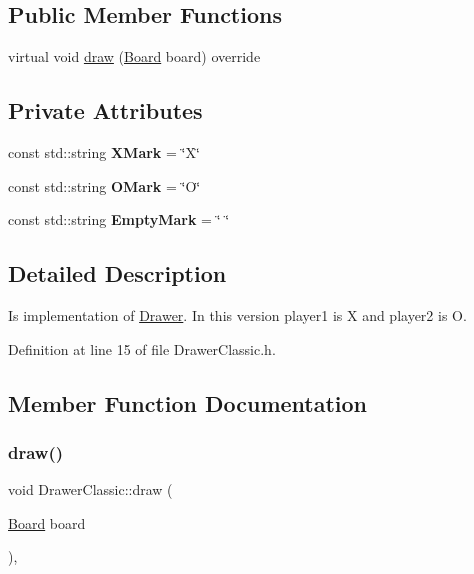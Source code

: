\subsection*{Public Member Functions}
\begin{DoxyCompactItemize}
\item 
virtual void \hyperlink{classDrawerClassic_ab5e18d90571afab9a2b8482b2d9d8264}{draw} (\hyperlink{classBoard}{Board} board) override
\end{DoxyCompactItemize}
\subsection*{Private Attributes}
\begin{DoxyCompactItemize}
\item 
\mbox{\label{classDrawerClassic_a31aba72f2a6463a1ad4a6974c31b65ae}} 
const std\+::string {\bfseries X\+Mark} = \char`\"{}X\char`\"{}
\item 
\mbox{\label{classDrawerClassic_a5f1c89c7c6d37eb435f447f1a5934e2b}} 
const std\+::string {\bfseries O\+Mark} = \char`\"{}O\char`\"{}
\item 
\mbox{\label{classDrawerClassic_a9d79d07a7b0d24a5c8cd3bbfb4e60d44}} 
const std\+::string {\bfseries Empty\+Mark} = \char`\"{} \char`\"{}
\end{DoxyCompactItemize}


\subsection{Detailed Description}
Is implementation of \hyperlink{classDrawer}{Drawer}. In this version player1 is X and player2 is O. 

Definition at line 15 of file Drawer\+Classic.\+h.



\subsection{Member Function Documentation}
\mbox{\label{classDrawerClassic_ab5e18d90571afab9a2b8482b2d9d8264}} 
\subsubsection{\texorpdfstring{draw()}{draw()}}
{\footnotesize\ttfamily void Drawer\+Classic\+::draw (\begin{DoxyParamCaption}\item[{\hyperlink{classBoard}{Board}}]{board }\end{DoxyParamCaption})\hspace{0.3cm}{\ttfamily [override]}, {\ttfamily [virtual]}}

